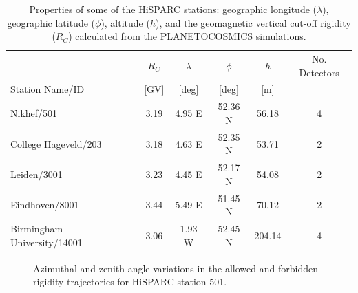 \begin{table}
	\begin{center}
		\caption{Properties of some of the HiSPARC stations: geographic longitude ($\lambda$), geographic latitude ($\phi$), altitude ($h$), and the geomagnetic vertical cut-off rigidity ($R_C$) calculated from the PLANETOCOSMICS simulations.}
		\label{tab:HS_stns}
		\begin{tabular}{l c c c c c}
			\hline
			& $R_C$  & $\lambda$ & $\phi$  & $h$  & No. Detectors\\
			Station Name/ID & [GV] & [deg] & [deg] & [m]  & \\
			\hline
			Nikhef/501 & 3.19 & 4.95 E & 52.36 N & 56.18 & 4 \\
			College Hageveld/203 & 3.18 & 4.63 E  & 52.35 N & 53.71  & 2 \\
			Leiden/3001 & 3.23 & 4.45 E & 52.17 N & 54.08 & 2 \\
			Eindhoven/8001  & 3.44 & 5.49 E & 51.45 N & 70.12 & 2 \\
			Birmingham University/14001  & 3.06 & 1.93 W & 52.45 N & 204.14 & 4  \\
			\hline
		\end{tabular}
	\end{center}
\end{table}

\begin{figure}[h]
	\centering
	
	\caption{Azimuthal and zenith angle variations in the allowed and forbidden rigidity trajectories for HiSPARC station 501.}
	\label{fig:R_C2}
\end{figure}

